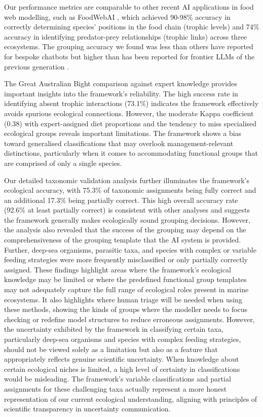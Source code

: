 Our performance metrics are comparable to other recent AI applications in food web modelling, such as FoodWebAI \citep{Noleto2024}, which achieved 90-98\% accuracy in correctly determining species' positions in the food chain (trophic levels) and 74\% accuracy in identifying predator-prey relationships (trophic links) across three ecosystems. The grouping accuracy we found was less than others have reported for bespoke chatbots but higher than has been reported for frontier LLMs of the previous generation \citep{sahu4946942taxobot}. 

The Great Australian Bight comparison against expert knowledge provides important insights into the framework's reliability. The high success rate in identifying absent trophic interactions (73.1\%) indicates the framework effectively avoids spurious ecological connections. However, the moderate Kappa coefficient (0.38) with expert-assigned diet proportions and the tendency to miss specialised ecological groups reveals important limitations. The framework shows a bias toward generalised classifications that may overlook management-relevant distinctions, particularly when it comes to accommodating functional groups that are comprised of only a single species.

Our detailed taxonomic validation analysis further illuminates the framework's ecological accuracy, with 75.3\% of taxonomic assignments being fully correct and an additional 17.3\% being partially correct. This high overall accuracy rate (92.6\% at least partially correct) is consistent with other analyses \citep{Noleto2024,dorm2025large} and suggests the framework generally makes ecologically sound grouping decisions. However, the analysis also revealed that the success of the grouping may depend on the comprehensiveness of the grouping template that the AI system is provided. Further, deep-sea organisms, parasitic taxa, and species with complex or variable feeding strategies were more frequently misclassified or only partially correctly assigned. These findings highlight areas where the framework's ecological knowledge may be limited or where the predefined functional group templates may not adequately capture the full range of ecological roles present in marine ecosystems. It also highlights where human triage will be needed when using these methods, showing the kinds of groups where the modeller needs to focus checking or redefine model structures to reduce erroneous assignments. However, the uncertainty exhibited by the framework in classifying certain taxa, particularly deep-sea organisms and species with complex feeding strategies, should not be viewed solely as a limitation but also as a feature that appropriately reflects genuine scientific uncertainty. When knowledge about certain ecological niches is limited, a high level of certainty in classifications would be misleading. The framework's variable classifications and partial assignments for these challenging taxa actually represent a more honest representation of our current ecological understanding, aligning with principles of scientific transparency in uncertainty communication.

